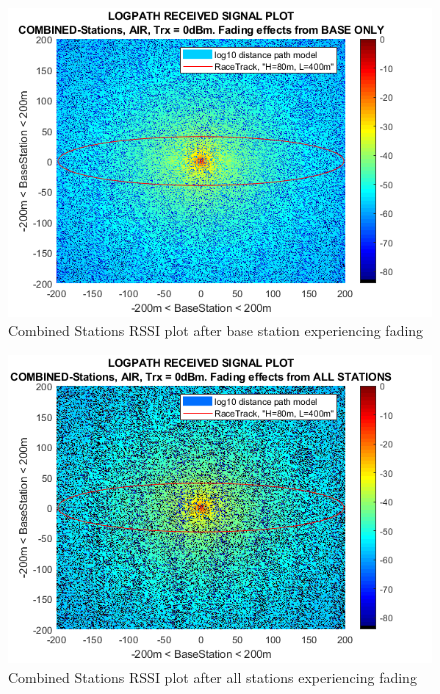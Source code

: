 \begin{figure}[H]
	\centering
	\includegraphics[width=\linewidth]{theory/fading/fig/logpathReceivedSignal_combinedStations_baseOnly.png}
	\caption{Combined Stations RSSI plot after base station experiencing fading}
	\label{fig:logpathReceivedSignal_combinedStations_baseOnly}
\end{figure}

\begin{figure}[H]
\centering
\includegraphics[width=\linewidth]{theory/fading/fig/logpathReceivedSignal_combinedStations_allStations.png}
\caption{Combined Stations RSSI plot after all stations experiencing fading}
\label{fig:logpathReceivedSignal_combinedStations_allStations}
\end{figure}

